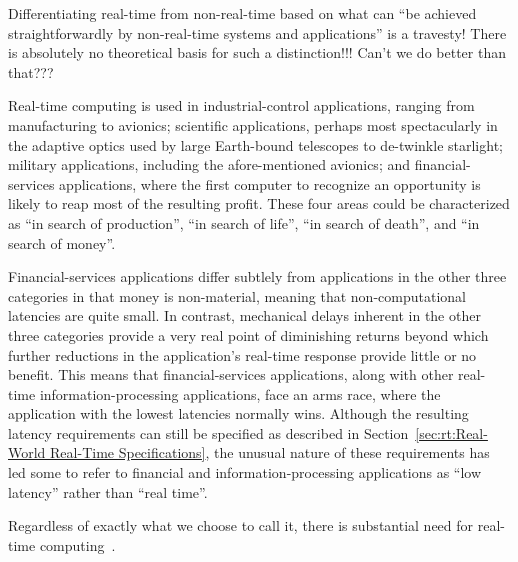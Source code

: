 \QuickQuiz{}
	Differentiating real-time from non-real-time based on what can
	``be achieved straightforwardly by non-real-time systems and
	applications'' is a travesty!
	There is absolutely no theoretical basis for such a distinction!!!
	Can't we do better than that???
 \QuickQuizEnd

Real-time computing is used in industrial-control applications, ranging from
manufacturing to avionics;
scientific applications, perhaps most spectacularly in the adaptive
optics used by
large Earth-bound telescopes to de-twinkle starlight;
military applications, including the afore-mentioned avionics;
and financial-services applications, where the first computer to recognize
an opportunity is likely to reap most of the resulting profit.
These four areas could be characterized as ``in search of production'',
``in search of life'', ``in search of death'', and ``in search of money''.

Financial-services applications differ subtlely from applications in
the other three categories in that money is non-material, meaning that
non-computational latencies are quite small.
In contrast, mechanical delays inherent in the other three categories
provide a very real point of diminishing returns beyond which further
reductions in the application's real-time response provide little or
no benefit.
This means that financial-services applications, along with other
real-time information-processing applications, face an arms race,
where the application with the lowest latencies normally wins.
Although the resulting latency requirements can still be specified
as described in
Section~\ref{sec:rt:Real-World Real-Time Specifications},
the unusual nature of these requirements has led some to refer to
financial and information-processing applications as ``low latency''
rather than ``real time''.

Regardless of exactly what we choose to call it, there is substantial
need for real-time
computing~\cite{JeremyWPeters2006NYTDec11,BillInmon2007a}.

